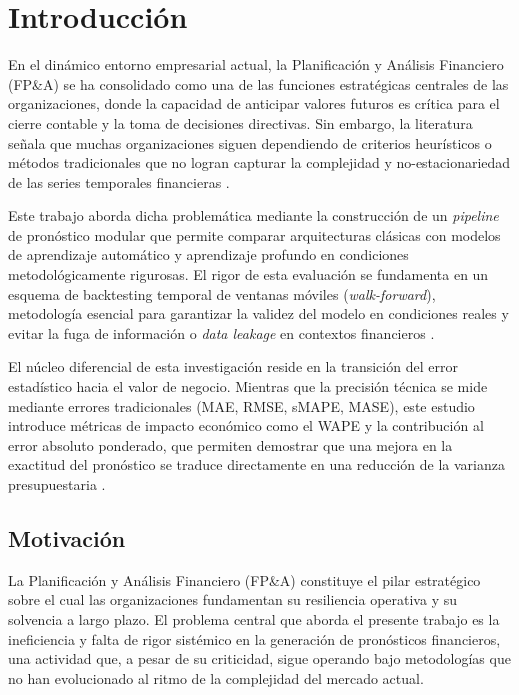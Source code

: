 \chapter{Introducción}
\label{cap:introduccion}

En el dinámico entorno empresarial actual, la Planificación y Análisis Financiero (FP\&A) se ha consolidado como una de las funciones estratégicas centrales de las organizaciones, donde la capacidad de anticipar valores futuros es crítica para el cierre contable y la toma de decisiones directivas. Sin embargo, la literatura señala que muchas organizaciones siguen dependiendo de criterios heurísticos o métodos tradicionales que no logran capturar la complejidad y no-estacionariedad de las series temporales financieras \parencite{Hyndman2021}.

Este trabajo aborda dicha problemática mediante la construcción de un \textit{pipeline} de pronóstico modular que permite comparar arquitecturas clásicas con modelos de aprendizaje automático y aprendizaje profundo en condiciones metodológicamente rigurosas. El rigor de esta evaluación se fundamenta en un esquema de backtesting temporal de ventanas móviles (\textit{walk-forward}), metodología esencial para garantizar la validez del modelo en condiciones reales y evitar la fuga de información o \textit{data leakage} en contextos financieros \parencite{Bergmeir2012}.

El núcleo diferencial de esta investigación reside en la transición del error estadístico hacia el valor de negocio. Mientras que la precisión técnica se mide mediante errores tradicionales (MAE, RMSE, sMAPE, MASE), este estudio introduce métricas de impacto económico como el WAPE y la contribución al error absoluto ponderado, que permiten demostrar que una mejora en la exactitud del pronóstico se traduce directamente en una reducción de la varianza presupuestaria \parencite{Makridakis2025M6}.

\section{Motivación}
\label{sec:motivacion}

La Planificación y Análisis Financiero (FP\&A) constituye el pilar estratégico sobre el cual las organizaciones fundamentan su resiliencia operativa y su solvencia a largo plazo. El problema central que aborda el presente trabajo es la ineficiencia y falta de rigor sistémico en la generación de pronósticos financieros, una actividad que, a pesar de su criticidad, sigue operando bajo metodologías que no han evolucionado al ritmo de la complejidad del mercado actual.

